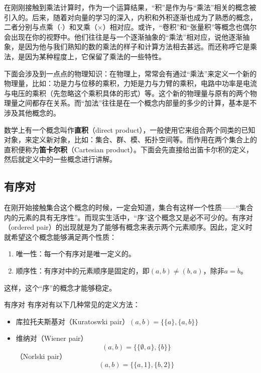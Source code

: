 
在刚刚接触到乘法计算时，作为一个运算结果，“积”是作为与“乘法”相关的概念被引入的。后来，随着对向量的学习的深入，内积和外积逐渐也成为了熟悉的概念，二者分别与点乘（$\cdot$）和叉乘（$\times$）相对应。或许，“卷积”和“张量积”等概念也偶尔会出现在你的视野中。他们往往是与一个逐渐抽象的“乘法”相对应，说他逐渐抽象，是因为他与我们熟知的数的乘法的样子和计算方法相去甚远。而还称呼它是乘法，是因为某种程度上，它保留了乘法的一些特性。

下面会涉及到一点点的物理知识：在物理上，常常会有通过“乘法”来定义一个新的物理量，比如：功是力与位移的乘积，力矩是力与力臂的乘积，电路中功率是电流与电压的乘积（先忽略这个乘积具体的形式）等。这个新的物理量与原有的两个物理量之间都存在关系。而“加法”往往是在一个概念内部量的多少的计算，基本是不涉及其他概念的。

数学上有一个概念叫作\textbf{直积}（direct product），一般使用它来组合两个同类的已知对象，来定义新对象，比如：集合、群、模、拓扑空间等。而作用在两个集合上的直积便称为\textbf{笛卡尔积}（Cartesian product）。下面会先直接给出笛卡尔积的定义，然后就定义中的一些概念进行讲解。



\subsection{有序对}

在刚开始接触集合这个概念的时候，一定会知道，集合有这样一个性质——“集合内的元素的具有无序性”。而现实生活中，“序”这个概念又是必不可少的。有序对（ordered pair）的出现就是为了能够有概念来表示两个元素顺序。因此，定义时就希望这个概念能够满足两个性质：

\begin{enumerate}
\item 唯一性：每一个有序对是唯一定义的。
\item 顺序性：有序对中的元素顺序是固定的，即$(a, b) \neq (b, a)$，除非$a = b$。
\end{enumerate}

这样，这个“序”的概念才能够稳定。


\begin{definition}{有序对}
有序对有以下几种常见的定义方法：
\begin{itemize}
\item 库拉托夫斯基对（Kuratoswki pair）$(a, b) = \{\{a\}, \{a, b\}\}$
\item 维纳对（Wiener pair）
\[ (a, b) = \{\{\emptyset, a\}, \{b\}\} \]
（Norlski pair）
\[ (a, b) = \{\{a, 1\}, \{b, 2\}\} \]
\end{itemize}
\end{definition}


